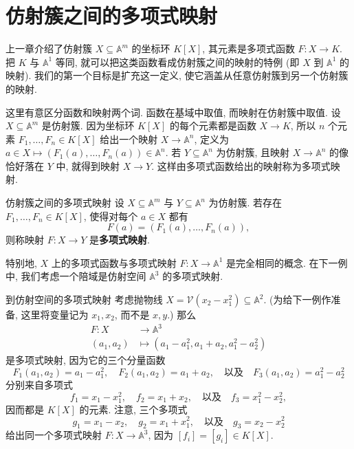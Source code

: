\section{仿射簇之间的多项式映射}\label{sec:polynomial-maps-between-affine-varieties}

上一章介绍了仿射簇 $X\subseteq\mathbb{A}^{m}$ 的坐标环 $K[X]$, 其元素是多项式函数 $F:X\to K$. 把 $K$ 与 $\mathbb{A}^{1}$ 等同, 就可以把这类函数看成仿射簇之间的映射的特例 (即 $X$ 到 $\mathbb{A}^{1}$ 的映射). 我们的第一个目标是扩充这一定义, 使它涵盖从任意仿射簇到另一个仿射簇的映射.

\BookPairedNoteLeft
  {这里有意区分\textquotedbl{}函数\textquotedbl{}和\textquotedbl{}映射\textquotedbl{}两个词. 函数在基域中取值, 而映射在仿射簇中取值.}
  {设 $X\subseteq\mathbb{A}^{m}$ 是仿射簇. 因为坐标环 $K[X]$ 的每个元素都是函数 $X\to K$, 所以 $n$ 个元素 $F_{1},\ldots,F_{n}\in K[X]$ 给出一个映射 $X\to\mathbb{A}^{n}$, 定义为 $a\in X\mapsto(F_{1}(a),\ldots,F_{n}(a))\in\mathbb{A}^{n}$.}
\noindent 若 $Y\subseteq\mathbb{A}^{n}$ 为仿射簇, 且映射 $X\to\mathbb{A}^{n}$ 的像恰好落在 $Y$ 中, 就得到映射 $X\to Y$. 这样由多项式函数给出的映射称为多项式映射.

\begin{Definition}{仿射簇之间的多项式映射}\leavevmode\label{def:polynomial-map-between-affine-varieties}
  设 $X\subseteq\mathbb{A}^{m}$ 与 $Y\subseteq\mathbb{A}^{n}$ 为仿射簇. 若存在 $F_{1},\ldots,F_{n}\in K[X]$, 使得对每个 $a\in X$ 都有
  \[
    F(a)=(F_{1}(a),\ldots,F_{n}(a)),
  \]
  则称映射 $F:X\to Y$ 是\textbf{多项式映射}.
\end{Definition}

特别地, $X$ 上的多项式函数与多项式映射 $F:X\to\mathbb{A}^{1}$ 是完全相同的概念. 在下一例中, 我们考虑一个陪域是仿射空间 $\mathbb{A}^{3}$ 的多项式映射.

\begin{Example}{到仿射空间的多项式映射}\leavevmode\label{ex:polynomial-map-to-affine-space}
  考虑抛物线 $X=\mathcal{V}(x_{2}-x_{1}^{2})\subseteq\mathbb{A}^{2}$. (为给下一例作准备, 这里将变量记为 $x_{1},x_{2}$, 而不是 $x,y$.) 那么
  \[
    \begin{aligned}
      F:X&\to\mathbb{A}^{3}\\
      (a_{1},a_{2})&\mapsto(a_{1}-a_{1}^{2},a_{1}+a_{2},a_{1}^{2}-a_{2}^{2})
    \end{aligned}
  \]
  是多项式映射, 因为它的三个分量函数
  \[
    F_{1}(a_{1},a_{2})=a_{1}-a_{1}^{2},\quad F_{2}(a_{1},a_{2})=a_{1}+a_{2},
    \quad\text{以及}\quad F_{3}(a_{1},a_{2})=a_{1}^{2}-a_{2}^{2}
  \]
  分别来自多项式
  \[
    f_{1}=x_{1}-x_{1}^{2},\quad f_{2}=x_{1}+x_{2},\quad\text{以及}\quad f_{3}=x_{1}^{2}-x_{2}^{2},
  \]
  因而都是 $K[X]$ 的元素. 注意, 三个多项式
  \[
    g_{1}=x_{1}-x_{2},\quad g_{2}=x_{1}+x_{1}^{2},\quad\text{以及}\quad g_{3}=x_{2}-x_{2}^{2}
  \]
  给出同一个多项式映射 $F:X\to\mathbb{A}^{3}$, 因为 $[f_{i}]=[g_{i}]\in K[X]$.
\end{Example}

